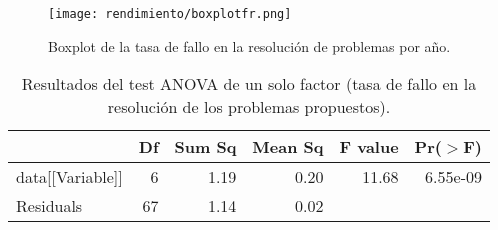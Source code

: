 \begin{figure}[H]
    \centering
    \texttt{[image: rendimiento/boxplotfr.png]}
    \caption{Boxplot de la tasa de fallo en la resolución de problemas por año.}
    \label{fig:boxplotfr}
\end{figure}

\begin{table}[H]
\centering
\caption{Resultados del test ANOVA de un solo factor (tasa de fallo en la resolución de los problemas propuestos).}
\label{tab:ANOVAfr}
\begin{tabular}{lrrrrr}
  \hline
 & Df & Sum Sq & Mean Sq & F value & Pr($>$F) \\ 
  \hline
data[[Variable]] & 6 & 1.19 & 0.20 & 11.68 & 6.55e-09 \\ 
  Residuals        & 67 & 1.14 & 0.02 &  &  \\ 
   \hline
\end{tabular}
\end{table}

